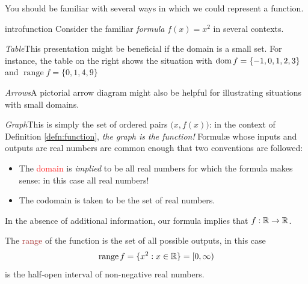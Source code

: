 
You should be familiar with several ways in which we could represent a function.

\begin{example}{}{introfunction}
Consider the familiar \emph{formula} $f(x)=x^2$ in several contexts.
\begin{description}\itemsep8pt
  \begin{minipage}[t]{0.7\linewidth}\vspace{-5pt}
  	\item \emph{Table}\lstsp This presentation might be beneficial if the domain is a small set. For instance, the table on the right shows the situation with $\operatorname{dom} f=\{-1,0,1,2,3\}$ and $\operatorname{range}f=\{0,1,4,9\}$
  
  	\item \emph{Arrows}\lstsp A pictorial arrow diagram might also be helpful for illustrating situations with small domains.
  
  
  	\item \emph{Graph}\lstsp This is simply the set of ordered pairs $\bigl(x,f(x)\bigr)$: in the context of Definition \ref{defn:function}, \emph{the graph is the function!}\smallbreak
	 	Formulæ whose inputs and outputs are real numbers are common enough that two conventions are followed:
	 	\begin{itemize}
	 	  \item The \textcolor{red}{domain} is \emph{implied} to be all real numbers for which the formula makes sense: in this case all real numbers!
			\item The codomain is taken to be the set of real numbers.
		\end{itemize}
		In the absence of additional information, our formula implies that $f:\mathbb{R}\to\mathbb{R}$.\smallbreak
		
	The \textcolor{Brown}{range} of the function is the set of all possible outputs, in this case
	\[\operatorname{range}f=\{x^2:x\in\mathbb{R}\}=[0,\infty)\]
	is the half-open interval of non-negative real numbers.\smallbreak
		

\end{minipage}
\end{description}
\end{example}
